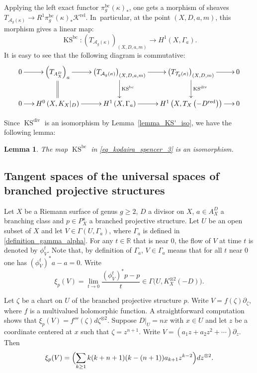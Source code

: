 \documentclass[10pt]{amsart}
\let\Subsection\subsection
\newcommand{\R}{\mathbb R}
\newcommand{\BC}{\mathrm{bc}}
\newcommand{\red}{\mathrm{red}}
\newcommand{\rel}{\mathrm{rel}}
\DeclareMathOperator{\Div}{div}
\DeclareMathOperator{\KS}{KS}
\theoremstyle{definition}
\theoremstyle{plain}
\newtheorem{lemma}[definition]{Lemma}
\begin{document}
Applying the left exact functor $\pi_g^{\BC}(\kappa)_*$, one gets a morphism of sheaves $T_{\mathcal A_g(\kappa)} \to R^1 \pi_g^{\BC}(\kappa)_* \mathcal K^{\rel}$. In~particular, at the point $(X, D, a, m)$, this morphism gives a linear map:
\begin{equation}\label{eq_kodaira_spencer_3}
\KS^{\BC}: \left(T_{\mathcal A_g(\kappa)}\right)_{(X, D, a, m)} \to H^1(X, \Gamma_a).
\end{equation}
It is easy to see that the following diagram is commutative:
\begin{equation*}
\xymatrix@C=.5cm{
0 \ar[r] &\left(T_{A_X^D}\right)_a \ar@{=}[d] \ar[r] & \left(T_{\mathcal A_g(\kappa)}\right)_{(X, D, a, m)} \ar[d]^{\KS^{\BC}} \ar[r] & \left(T_{\mathcal T_g(\kappa)}\right)_{(X, D, m)} \ar[d]^{\KS^{\Div}} \ar[r] & 0 \\ 0 \ar[r] & H^0\left(X, K_X|_D\right) \ar [r] & H^1\left(X, \Gamma_a\right) \ar[r] & H^1\left(X, T_X\left(-D^{\red}\right)\right) \ar[r]& 0
}
\end{equation*}

Since $\KS^{\Div}$ is an isomorphism by Lemma~\ref{lemma_KS'_iso}, we have the following lemma:

\begin{lemma}
The map $\KS^{\BC}$ in \eqref{eq_kodaira_spencer_3} is an isomorphism.
\end{lemma}

\Subsection{Tangent spaces of the universal spaces of branched projective structures}\label{subsection_tangent_spaces_univ_spaces_bps}

Let $X$ be a Riemann surface of genus $g \ge 2$, $D$ a divisor on $X$, $a \in A_X^D$ a branching class and $p \in P_X^a$ a branched projective structure.
Let $U$ be an open subset of $X$ and let $V \in\Gamma(U, \Gamma_a)$, where $\Gamma_a$ is defined in \eqref{definition_gamma_alpha}.
For any $t \in \R$ that is near $0$, the flow of $V$ at time $t$ is denoted by $\phi^t_V$.
Note that, by definition of $\Gamma_a$, $V \in \Gamma_a$ means that for all $t$ near $0$ one has $\left(\phi_V^t\right)^* a - a = 0$. Write
\begin{equation*}
\xi_{p}(V) = \lim_{t \to 0} \frac{(\phi^t_V)^*p - p}t \in \Gamma\bigl(U, K_X^{\otimes 2}(-D)\bigr).
\end{equation*}

Let $\zeta$ be a chart on $U$ of the branched projective structure $p$.
Write $V = f(\zeta)\partial_{\zeta}$, where $f$ is a multivalued holomorphic function.
A straightforward computation shows that $\xi_p(V) = f'''(\zeta)d\zeta^{\otimes 2}$.
Suppose $D|_U = nx$ with $x \in U$ and let $z$ be a coordinate centered at $x$ such that $\zeta = z^{n+1}$.
Write $V = (a_1z + a_2z^2 + \cdots)\partial_z$.
Then
\[
\xi_p(V) = \Bigl(\sum_{k \ge 1} k(k + n+1)(k - (n+1))a_{k+1}z^{k-2}\Bigr)dz^{\otimes 2}.
\]
\end{document}
